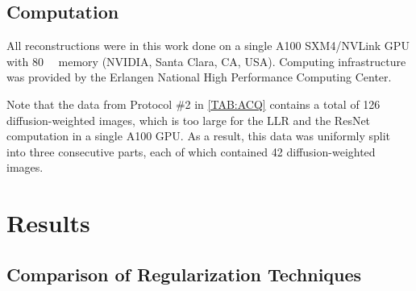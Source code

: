 \documentclass[journal,twoside,web]{ieeecolor}
\newcommand{\argmin}{\operatornamewithlimits{argmin}}
\newcommand{\norm}[1]{\left\lVert#1\right\rVert}
\begin{document}

    \subsection{Computation}

    All reconstructions were in this work done on a single A100 SXM4/NVLink GPU
    with \SI{80}{\giga\byte} memory (NVIDIA, Santa Clara, CA, USA).
    Computing infrastructure was provided by
    the Erlangen National High Performance Computing Center.
    
    Note that the data from Protocol \#2 in \cref{TAB:ACQ} contains a total of 
    126 diffusion-weighted images, which is too large for the LLR and the ResNet computation 
    in a single A100 GPU. As a result, this data was uniformly 
    split into three consecutive parts, 
    each of which contained 42 diffusion-weighted images.

	\section{Results}

	\subsection{Comparison of Regularization Techniques}
\end{document}

